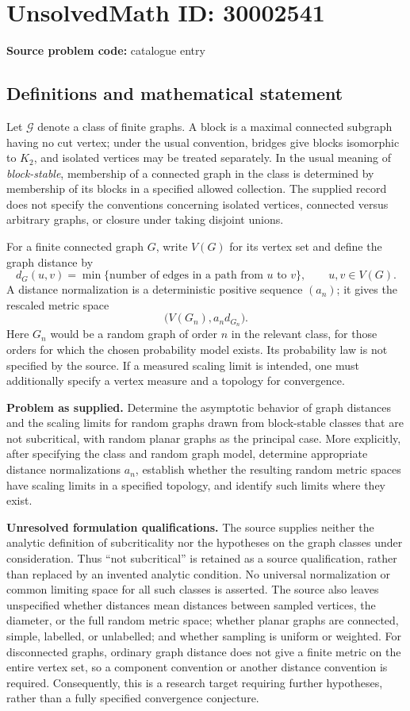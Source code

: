\documentclass[11pt]{article}
\begin{document}
\section*{UnsolvedMath ID: 30002541}
\textbf{Source problem code:} catalogue entry
\subsection{Definitions and mathematical statement}
Let \(\mathcal G\) denote a class of finite graphs. A block is a maximal connected subgraph having no cut vertex; under the usual convention, bridges give blocks isomorphic to \(K_2\), and isolated vertices may be treated separately. In the usual meaning of \emph{block-stable}, membership of a connected graph in the class is determined by membership of its blocks in a specified allowed collection. The supplied record does not specify the conventions concerning isolated vertices, connected versus arbitrary graphs, or closure under taking disjoint unions.

For a finite connected graph \(G\), write \(V(G)\) for its vertex set and define the graph distance by
\[
 d_G(u,v)=\min\{\text{number of edges in a path from }u\text{ to }v\},\qquad u,v\in V(G).
\]
A distance normalization is a deterministic positive sequence \((a_n)\); it gives the rescaled metric space
\[
 \bigl(V(G_n),a_n d_{G_n}\bigr).
\]
Here \(G_n\) would be a random graph of order \(n\) in the relevant class, for those orders for which the chosen probability model exists. Its probability law is not specified by the source. If a measured scaling limit is intended, one must additionally specify a vertex measure and a topology for convergence.

\textbf{Problem as supplied.} Determine the asymptotic behavior of graph distances and the scaling limits for random graphs drawn from block-stable classes that are not subcritical, with random planar graphs as the principal case. More explicitly, after specifying the class and random graph model, determine appropriate distance normalizations \(a_n\), establish whether the resulting random metric spaces have scaling limits in a specified topology, and identify such limits where they exist.

\textbf{Unresolved formulation qualifications.} The source supplies neither the analytic definition of subcriticality nor the hypotheses on the graph classes under consideration. Thus ``not subcritical'' is retained as a source qualification, rather than replaced by an invented analytic condition. No universal normalization or common limiting space for all such classes is asserted. The source also leaves unspecified whether distances mean distances between sampled vertices, the diameter, or the full random metric space; whether planar graphs are connected, simple, labelled, or unlabelled; and whether sampling is uniform or weighted. For disconnected graphs, ordinary graph distance does not give a finite metric on the entire vertex set, so a component convention or another distance convention is required. Consequently, this is a research target requiring further hypotheses, rather than a fully specified convergence conjecture.
\end{document}
